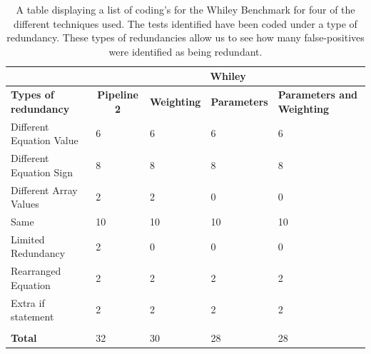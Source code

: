 \begin{table}[h]
\centering

\begin{tabular}{|l|l|l|l|l|}
\hline
                          & \multicolumn{4}{c|}{{\bf Whiley}}                                                             \\ \hline
{\bf Types of redundancy} & \multicolumn{1}{c|}{{\bf Pipeline 2}} & {\bf Weighting} & {\bf Parameters} & {\bf Parameters and Weighting} \\ \hline
Different Equation Value  & 6                                     & 6               & 6                & 6                \\ \hline
Different Equation Sign   & 8                                     & 8               & 8                & 8                \\ \hline
Different Array Values    & 2                                     & 2               & 0                & 0                \\ \hline
Same                      & 10                                    & 10              & 10               & 10               \\ \hline
Limited Redundancy        & 2                                     & 0               & 0                & 0                \\ \hline
Rearranged Equation       & 2                                     & 2               & 2                & 2                \\ \hline
Extra if statement        & 2                                     & 2               & 2                & 2                \\ \hline
                          &                                       &                 &                  &                  \\ \hline
{\bf Total}               & 32                                    & 30              & 28               & 28               \\ \hline
\end{tabular}
\caption{A table displaying a list of coding's for the Whiley Benchmark for four of the different techniques used. The tests identified have been coded under a type of redundancy. These types of redundancies allow us to see how many false-positives were identified as being redundant. }
\label{whileycoding}
\end{table}


